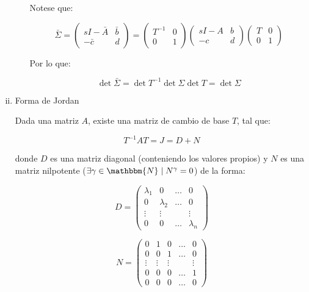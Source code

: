 \begin{enumerate}[i)]
\begin{enumerate}[a)]
Notese que:

\begin{equation}
\bar{\Sigma} =
\begin{pmatrix}
sI - \bar{A} & \bar{b} \\
-\bar{c} & d
\end{pmatrix} =
\begin{pmatrix}
T^{-1} & 0 \\
0 & 1
\end{pmatrix}
\begin{pmatrix}
sI - A & b \\
-c & d
\end{pmatrix}
\begin{pmatrix}
T & 0 \\
0 & 1
\end{pmatrix} \nonumber
\end{equation}

Por lo que:

\begin{equation}
\det{\bar{\Sigma}} = \det{T^{-1}} \det{\Sigma} \det{T} = \det{\Sigma} \nonumber
\end{equation}

\end{enumerate}

\item Forma de Jordan

Dada una matriz $A$, existe una matriz de cambio de base $T$, tal que:

\begin{equation}
T^{-1} A T = J = D + N
\end{equation}

donde $D$ es una matriz diagonal (conteniendo los valores propios) y $N$ es una matriz nilpotente ($\exists \gamma \in \mathbbm{N} \mid N^{\gamma} = 0$) de la forma:

\begin{equation}
D =
\begin{pmatrix}
\lambda_1 & 0 & \dots & 0 \\
0 & \lambda_2 & \dots & 0 \\
\vdots & \vdots & & \vdots \\
0 & 0 & \dots & \lambda_n
\end{pmatrix} \nonumber
\end{equation}

\begin{equation}
N =
\begin{pmatrix}
0 & 1 & 0 & \dots & 0 \\
0 & 0 & 1 & \dots & 0 \\
\vdots & \vdots & \vdots & & \vdots \\
0 & 0 & 0 & \dots & 1 \\
0 & 0 & 0 & \dots & 0
\end{pmatrix} \nonumber
\end{equation}


\end{enumerate}
